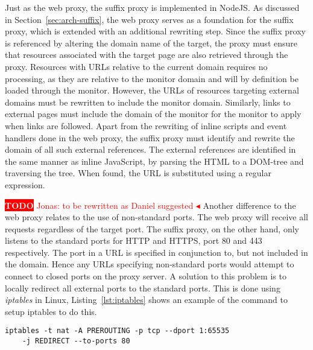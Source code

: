 \documentclass{llncs}
\newcommand{\todo}[1]{\colorbox{red}{\textcolor{white}{\sffamily\bfseries\scriptsize TODO}} \textcolor{red}{#1} \textcolor{red}{$\blacktriangleleft$}}
\begin{document}
%

Just as the web proxy, the suffix proxy is implemented in NodeJS. 
As discussed in Section~\ref{sec:arch-suffix}, the web proxy serves as a 
foundation for the suffix proxy, which is extended with an additional rewriting step. 
Since the suffix proxy is referenced by altering the domain name of the target, 
the proxy must ensure that resources associated with the target page are also 
retrieved through the proxy. Resources with URLs relative to the current domain 
requires no processing, as they are relative to the monitor domain and will by 
definition be loaded through the monitor. 
However, the URLs of resources targeting external domains must be rewritten to 
include the monitor domain. Similarly, links to external pages must include the domain of the monitor 
for the %
monitor%
to apply 
when links are followed.
Apart from the rewriting of inline 
scripts and event handlers done in the web proxy, the suffix proxy must 
identify and rewrite the domain of all such external references. 
The external references are identified in the same manner as inline JavaScript, 
by parsing the HTML to a DOM-tree and traversing the tree. When found, the 
URL is substituted using a regular expression.%

\todo{Jonas: to be rewritten as Daniel suggested}
Another difference to the web proxy relates to the use of non-standard ports.
The web proxy will receive all requests regardless of the target port. The 
suffix proxy, on the other hand, only listens to the standard ports for HTTP and HTTPS, port 80 and 
443 respectively. The port in a URL is specified in conjunction to, but not included in the domain.
Hence any URLs specifying non-standard ports would attempt to connect to closed 
ports on the proxy server. A solution to this problem is to locally redirect 
all external ports to the standard ports. This is done using \emph{iptables} in Linux, 
Listing~\ref{lst:iptables} shows an example of the command to setup iptables to do this.

\begin{lstlisting}[label=lst:iptables, caption=Example of redirecting ports using iptables]
iptables -t nat -A PREROUTING -p tcp --dport 1:65535 
	-j REDIRECT --to-ports 80
\end{lstlisting}
\end{document}
